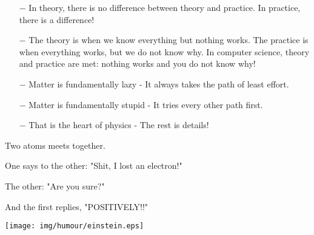 	\begin{center}\underline{\hspace{5 cm}}\end{center}	
	
	\begin{itemize}	 
		\item[$-$] In theory, there is no difference between theory and practice. In practice, there is a difference!
	
		\item[$-$] The theory is when we know everything but nothing works. The practice is when everything works, but we do not know why. In computer science, theory and practice are met: nothing works and you do not know why!
	\end{itemize}

	\begin{center}\underline{\hspace{5 cm}}\end{center}

	\begin{itemize}	 
		\item[$-$] Matter is fundamentally lazy - It always takes the path of least effort.
	
		\item[$-$] Matter is fundamentally stupid - It tries every other path first.
		
		\item[$-$] That is the heart of physics - The rest is details!
	\end{itemize}
	
	\begin{center}\underline{\hspace{5 cm}}\end{center}
	
	Two atoms meets together. 
	
	One says to the other: "Shit, I lost an electron!"
	
	The other: "Are you sure?"
	
	And the first replies, "POSITIVELY!!"
	
	\begin{center}\underline{\hspace{5 cm}}\end{center}

	\begin{center}
	\texttt{[image: img/humour/einstein.eps]}
	\end{center}
	
	\begin{center}\underline{\hspace{5 cm}}\end{center}	
	
